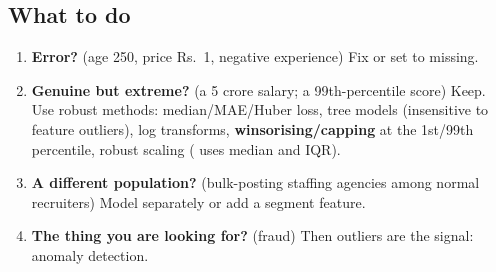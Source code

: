 \subsection{What to do}
\begin{enumerate}
\item \textbf{Error?} (age 250, price Rs.~1, negative experience) Fix or set to missing.
\item \textbf{Genuine but extreme?} (a 5 crore salary; a 99th-percentile score) Keep. Use robust methods: median/MAE/Huber loss,
  tree models (insensitive to feature outliers), log transforms, \textbf{winsorising/capping} at the 1st/99th percentile, robust scaling
  ( uses median and IQR).
\item \textbf{A different population?} (bulk-posting staffing agencies among normal recruiters) Model separately or add a segment
  feature.
\item \textbf{The thing you are looking for?} (fraud) Then outliers are the signal: anomaly detection.
\end{enumerate}

